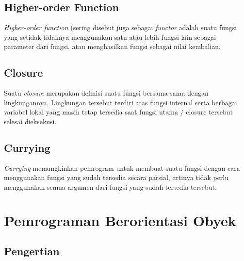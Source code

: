 \lstset{language=JavaScript,caption=Ekspresi Lambda di JavaScript}


\subsection{Higher-order Function}

\textit{Higher-order function} (sering disebut juga sebagai \textit{functor} adalah suatu fungsi yang setidak-tidaknya menggunakan satu atau lebih fungsi lain sebagai parameter dari fungsi, atau menghasilkan fungsi sebagai nilai kembalian. 

\lstset{language=JavaScript,caption=Higher-order Function di JavaScript}


\subsection{Closure}

Suatu \textit{closure} merupakan definisi suatu fungsi bersama-sama dengan lingkungannya. Lingkungan tersebut terdiri atas fungsi internal serta berbagai variabel lokal yang masih tetap tersedia saat fungsi utama / closure tersebut selesai dieksekusi. 

\lstset{language=JavaScript,caption=Closure di JavaScript}


\subsection{Currying}

\textit{Currying} memungkinkan pemrogram untuk membuat suatu fungsi dengan cara menggunakan fungsi yang sudah tersedia secara parsial, artinya tidak perlu menggunakan semua argumen dari fungsi yang sudah tersedia tersebut.

\lstset{language=JavaScript,caption=Currying di JavaScript}


\section{Pemrograman Berorientasi Obyek}

\subsection{Pengertian}

